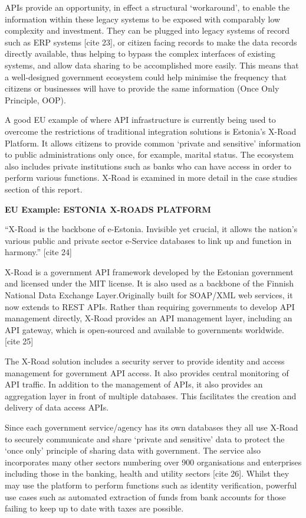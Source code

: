 APIs provide an opportunity, in effect a structural ‘workaround’, to enable the
information within these legacy systems to be exposed with comparably low complexity
and investment. They can be plugged into legacy systems of record such as ERP
systems [cite 23], or citizen facing records to make the data records directly
available, thus helping to bypass the complex interfaces of existing systems,
and allow data sharing to be accomplished more easily. This means that a
well-designed government ecosystem could help minimise the frequency that
citizens or businesses will have to provide the same information (Once Only
Principle, OOP).

A good EU example of where API infrastructure is currently being used to overcome
the restrictions of traditional integration solutions is Estonia’s X-Road Platform.
It allows citizens to provide common ‘private and sensitive’ information to public administrations only once, for example, marital status. The ecosystem also includes
private institutions such as banks who can have access in order to perform various
functions. X-Road is examined in more detail in the case studies section of this report.

\textbf{EU Example: ESTONIA X-ROADS PLATFORM}

“X-Road is the backbone of e-Estonia. Invisible yet crucial, it allows the
nation’s various public and private sector e-Service databases to link up and
function in harmony.” [cite 24]

X-Road is a government API framework developed by the Estonian government
and licensed under the MIT license. It is also used as a backbone of the Finnish
National Data Exchange Layer.Originally built for SOAP/XML web services, it now
extends to REST APIs. Rather than requiring governments to develop API management
directly, X-Road provides an API management layer, including an API gateway,
which is open-sourced and available to governments worldwide. [cite 25]

The X-Road solution includes a security server to provide identity and access
management for government API access. It also provides central monitoring of
API traffic. In addition to the management of APIs, it also provides an
aggregation layer in front of multiple databases. This facilitates the creation
and delivery of data access APIs.

Since each government service/agency has its own databases they all use X-Road
to securely communicate and share ‘private and sensitive’ data to protect the
‘once only’ principle of sharing data with government. The service also incorporates
many other sectors numbering over 900 organisations and enterprises including those
in the banking, health and utility sectors [cite 26]. Whilst they may use the platform to
perform functions such as identity verification, powerful use cases such as automated extraction of funds from bank accounts for those failing to keep up to date with
taxes are possible.

